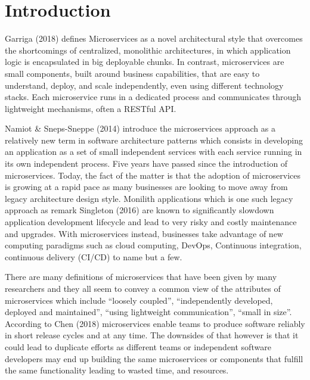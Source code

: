 \documentclass{article}
\begin{document}
\section{Introduction}


Garriga (2018) defines Microservices as a novel architectural style that overcomes the shortcomings of centralized, monolithic architectures, in which application logic is encapsulated in big deployable chunks. In contrast, microservices are small components, built around business capabilities, that are easy to understand, deploy, and scale independently, even using different technology stacks. Each microservice runs in a dedicated process and communicates through lightweight mechanisms, often a RESTful API.


Namiot \& Sneps-Sneppe (2014) introduce the microservices approach as a relatively new term in software architecture patterns which consists in developing an application as a set of small independent services with each service running in its own independent process. Five years have passed since the introduction of microservices. Today, the fact of the matter is that the adoption of microservices is growing at a rapid pace as many businesses are looking to move away from legacy architecture design style. Monilith applications which is one such legacy approach as remark Singleton (2016) are known to significantly slowdown application development lifecycle and lead to very risky and costly maintenance and upgrades. With microservices instead, businesses take advantage of new computing paradigms such as cloud computing, DevOps, Continuous integration, continuous delivery (CI/CD) to name but a few.


There are many definitions of microservices that have been given by many researchers and they all seem to convey a common view of the attributes of microservices which include “loosely coupled”, “independently developed, deployed and maintained”, “using lightweight communication”, “small in size”. According to Chen (2018) microservices enable teams to produce software reliably in short release cycles and at any time. The downsides of that however is that it could lead to duplicate efforts as different teams or independent software developers may end up building the same microservices or components that fulfill the same functionality leading to wasted time, and resources.
\end{document}
